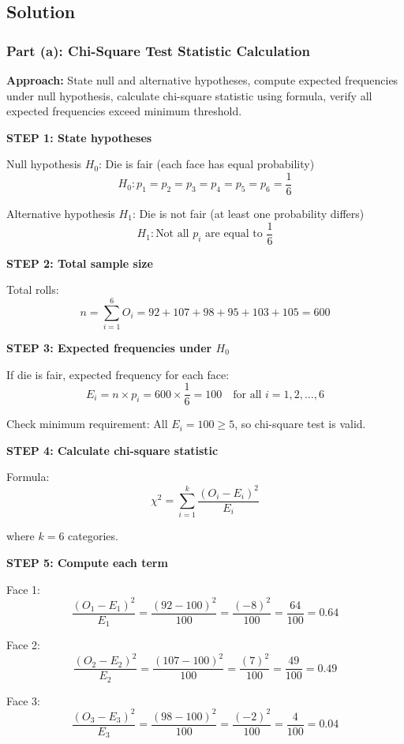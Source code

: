 \documentclass[12pt]{article}
\begin{document}
\subsection{Solution}

\subsubsection{Part (a): Chi-Square Test Statistic Calculation}

\begin{solution}

\textbf{Approach:} State null and alternative hypotheses, compute expected frequencies under null hypothesis, calculate chi-square statistic using formula, verify all expected frequencies exceed minimum threshold.

\textbf{STEP 1: State hypotheses}

Null hypothesis $H_0$: Die is fair (each face has equal probability)
\[
H_0: p_1 = p_2 = p_3 = p_4 = p_5 = p_6 = \frac{1}{6}
\]

Alternative hypothesis $H_1$: Die is not fair (at least one probability differs)
\[
H_1: \text{Not all } p_i \text{ are equal to } \frac{1}{6}
\]

\textbf{STEP 2: Total sample size}

Total rolls:
\[
n = \sum_{i=1}^6 O_i = 92 + 107 + 98 + 95 + 103 + 105 = 600
\]

\textbf{STEP 3: Expected frequencies under $H_0$}

If die is fair, expected frequency for each face:
\[
E_i = n \times p_i = 600 \times \frac{1}{6} = 100 \quad \text{for all } i = 1, 2, \ldots, 6
\]

Check minimum requirement: All $E_i = 100 \geq 5$, so chi-square test is valid.

\textbf{STEP 4: Calculate chi-square statistic}

Formula:
\[
\chi^2 = \sum_{i=1}^k \frac{(O_i - E_i)^2}{E_i}
\]

where $k = 6$ categories.

\textbf{STEP 5: Compute each term}

Face 1:
\[
\frac{(O_1 - E_1)^2}{E_1} = \frac{(92 - 100)^2}{100} = \frac{(-8)^2}{100} = \frac{64}{100} = 0.64
\]

Face 2:
\[
\frac{(O_2 - E_2)^2}{E_2} = \frac{(107 - 100)^2}{100} = \frac{(7)^2}{100} = \frac{49}{100} = 0.49
\]

Face 3:
\[
\frac{(O_3 - E_3)^2}{E_3} = \frac{(98 - 100)^2}{100} = \frac{(-2)^2}{100} = \frac{4}{100} = 0.04
\]


\end{solution}
\end{document}
